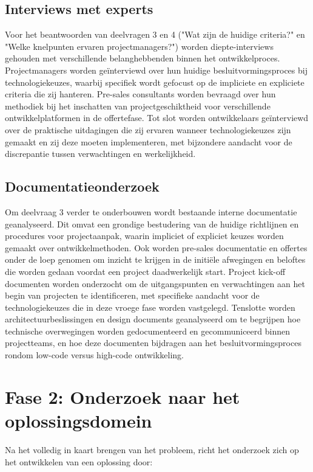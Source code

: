 \subsection{Interviews met experts}
Voor het beantwoorden van deelvragen 3 en 4 ("Wat zijn de huidige criteria?" \; \hbox{en} \, "Welke knelpunten ervaren projectmanagers?") worden diepte-interviews gehouden met verschillende belanghebbenden binnen het ontwikkelproces. Projectmanagers worden geïnterviewd over hun huidige besluitvormingsproces bij technologiekeuzes, waarbij specifiek wordt gefocust op de impliciete en expliciete criteria die zij hanteren. Pre-sales consultants worden bevraagd over hun methodiek bij het inschatten van projectgeschiktheid voor verschillende ontwikkelplatformen in de offertefase. Tot slot worden ontwikkelaars geïnterviewd over de praktische uitdagingen die zij ervaren wanneer technologiekeuzes zijn gemaakt en zij deze moeten implementeren, met bijzondere aandacht voor de discrepantie tussen verwachtingen en werkelijkheid.
\subsection{Documentatieonderzoek}
Om deelvraag 3 verder te onderbouwen wordt bestaande interne documentatie geanalyseerd. Dit omvat een grondige bestudering van de huidige richtlijnen en procedures voor projectaanpak, waarin impliciet of expliciet keuzes worden gemaakt over ontwikkelmethoden. Ook worden pre-sales documentatie en offertes onder de loep genomen om inzicht te krijgen in de initiële afwegingen en beloftes die worden gedaan voordat een project daadwerkelijk start. Project kick-off documenten worden onderzocht om de uitgangspunten en verwachtingen aan het begin van projecten te identificeren, met specifieke aandacht voor de technologiekeuzes die in deze vroege fase worden vastgelegd. Tenslotte worden architectuurbeslissingen en design documents geanalyseerd om te begrijpen hoe technische overwegingen worden gedocumenteerd en gecommuniceerd binnen projectteams, en hoe deze documenten bijdragen aan het besluitvormingsproces rondom low-code versus high-code ontwikkeling.

\section{Fase 2: Onderzoek naar het oplossingsdomein}
Na het volledig in kaart brengen van het probleem, richt het onderzoek zich op het ontwikkelen van een oplossing door:
